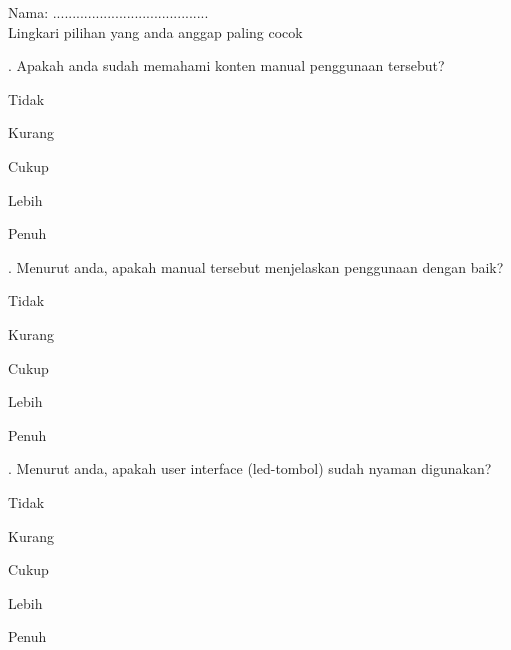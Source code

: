 \documentclass[12pt,]{article}
\begin{document}
	Nama: ........................................\\
	
	\vspace*{20pt}
	\noindent Lingkari pilihan yang anda anggap paling cocok
	\vspace*{20pt}
	
	. Apakah anda sudah memahami konten manual penggunaan tersebut?\\
	\begin{itemize*}
		\item Tidak \hspace*{25pt}
		\item Kurang \hspace*{25pt}
		\item Cukup \hspace*{25pt}
		\item Lebih \hspace*{25pt}
		\item Penuh \hspace*{25pt}
	\end{itemize*}

	\vspace*{10pt}
	
	. Menurut anda, apakah manual tersebut menjelaskan penggunaan dengan baik?\\
	\begin{itemize*}
		\item Tidak \hspace*{25pt}
		\item Kurang \hspace*{25pt}
		\item Cukup \hspace*{25pt}
		\item Lebih \hspace*{25pt}
		\item Penuh \hspace*{25pt}
	\end{itemize*}

	\vspace*{10pt}

	. Menurut anda, apakah user interface (led-tombol) sudah nyaman digunakan?\\
	\begin{itemize*}
		\item Tidak \hspace*{25pt}
		\item Kurang \hspace*{25pt}
		\item Cukup \hspace*{25pt}
		\item Lebih \hspace*{25pt}
		\item Penuh \hspace*{25pt}
	\end{itemize*}
\end{document}
